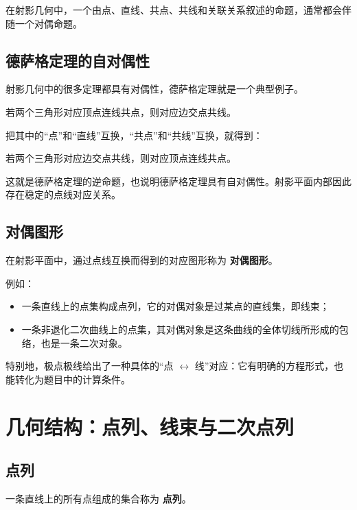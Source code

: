 \begin{conclusion}
在射影几何中，一个由点、直线、共点、共线和关联关系叙述的命题，通常都会伴随一个对偶命题。
\end{conclusion}

\section{德萨格定理的自对偶性}
射影几何中的很多定理都具有对偶性，德萨格定理就是一个典型例子。

\begin{theorem}
若两个三角形对应顶点连线共点，则对应边交点共线。
\end{theorem}

把其中的“点”和“直线”互换，“共点”和“共线”互换，就得到：

\begin{theorem}
若两个三角形对应边交点共线，则对应顶点连线共点。
\end{theorem}

这就是德萨格定理的逆命题，也说明德萨格定理具有自对偶性。射影平面内部因此存在稳定的点线对应关系。

\section{对偶图形}
\begin{definition}
在射影平面中，通过点线互换而得到的对应图形称为 \textbf{对偶图形}。
\end{definition}

例如：

\begin{itemize}
    \item 一条直线上的点集构成点列，它的对偶对象是过某点的直线集，即线束；
    \item 一条非退化二次曲线上的点集，其对偶对象是这条曲线的全体切线所形成的包络，也是一条二次对象。
\end{itemize}

特别地，极点极线给出了一种具体的“点 $\leftrightarrow$ 线”对应：它有明确的方程形式，也能转化为题目中的计算条件。

\chapter{几何结构：点列、线束与二次点列}

\section{点列}
\begin{definition}
一条直线上的所有点组成的集合称为 \textbf{点列}。
\end{definition}

